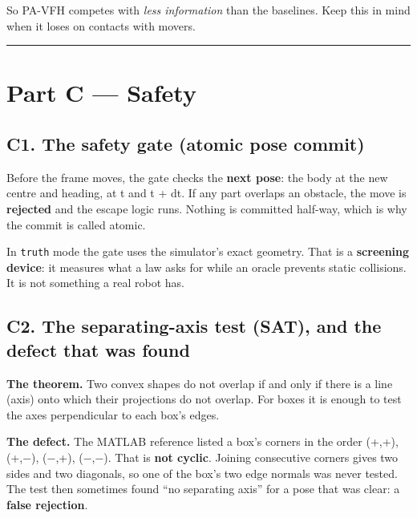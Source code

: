 \documentclass[
  10.5pt,
  a4paper,
]{article}
\begin{document}
So PA-VFH competes with \emph{less information} than the baselines. Keep
this in mind when it loses on contacts with movers.

\begin{center}\rule{0.5\linewidth}{0.5pt}\end{center}

\hypertarget{part-c-safety}{%
\section{Part C --- Safety}\label{part-c-safety}}

\hypertarget{c1.-the-safety-gate-atomic-pose-commit}{%
\subsection{C1. The safety gate (atomic pose
commit)}\label{c1.-the-safety-gate-atomic-pose-commit}}

Before the frame moves, the gate checks the \textbf{next pose}: the body
at the new centre and heading, at t and t + dt. If any part overlaps an
obstacle, the move is \textbf{rejected} and the escape logic runs.
Nothing is committed half-way, which is why the commit is called atomic.

In \texttt{truth} mode the gate uses the simulator's exact geometry.
That is a \textbf{screening device}: it measures what a law asks for
while an oracle prevents static collisions. It is not something a real
robot has.

\hypertarget{c2.-the-separating-axis-test-sat-and-the-defect-that-was-found}{%
\subsection{C2. The separating-axis test (SAT), and the defect that was
found}\label{c2.-the-separating-axis-test-sat-and-the-defect-that-was-found}}

\textbf{The theorem.} Two convex shapes do not overlap if and only if
there is a line (axis) onto which their projections do not overlap. For
boxes it is enough to test the axes perpendicular to each box's edges.

\textbf{The defect.} The MATLAB reference listed a box's corners in the
order (+,+), (+,−), (−,+), (−,−). That is \textbf{not cyclic}. Joining
consecutive corners gives two sides and two diagonals, so one of the
box's two edge normals was never tested. The test then sometimes found
``no separating axis'' for a pose that was clear: a \textbf{false
rejection}.
\end{document}
